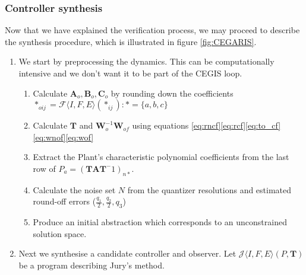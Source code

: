 \documentclass[runningheads,a4paper]{llncs}
\newcommand{\mat}[1]{\boldsymbol{#1}}
\begin{document}
\subsubsection{Controller synthesis}\label{sec:cof_synth}
Now that we have explained the verification process, we may proceed to describe the synthesis procedure, which is illustrated in figure \ref{fig:CEGARIS}.
\begin{enumerate}
\item We start by preprocessing the dynamics. This can be computationally intensive and we don't want it to be part of the CEGIS loop.
\begin{enumerate}
\item Calculate $\mat{A}_o,\mat{B}_o,\mat{C}_o$ by rounding down the coefficients $*_{oij}=\mathcal{F}\langle I,F,E\rangle (*_{ij}) : *=\{a,b,c\}$
\item Calculate $\mat{T}$ and $\mat{W}_o^{-1}\mat{W}_{of}$ using equations \eqref{eq:rncf}\eqref{eq:rcf}\eqref{eq:to_cf}\eqref{eq:wnof}\eqref{eq:wof}
\item Extract the Plant's characteristic polynomial coefficients from the last row of $P_a=(\mat{T}\mat{A}\mat{T}^-1)_{n*}$.
\item Calculate the noise set $N$ from the quantizer resolutions and estimated round-off errors ($\frac{q_1}{2},\frac{q_2}{2},q_3$)
\item Produce an initial abstraction which corresponds to an unconstrained solution space.
\end{enumerate}
\item Next we synthesise a candidate controller and observer. Let $\mathcal{J}\langle I,F,E \rangle (P,\mat{T})$ be a program describing Jury's method.
\end{enumerate}
\end{document}
